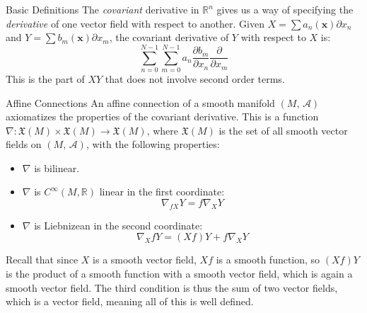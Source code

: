 \documentclass{beamer}
\begin{document}
    \begin{frame}{Basic Definitions}
        The \textit{covariant} derivative in $\mathbb{R}^{n}$ gives us a way
        of specifying the \textit{derivative} of one vector field with respect
        to another. Given $X=\sum{a}_{n}(\mathbf{x})\partial{x}_{n}$ and
        $Y=\sum{b}_{m}(\mathbf{x})\partial{x}_{m}$, the covariant derivative
        of $Y$ with respect to $X$ is:
        \begin{equation}
            \sum_{n=0}^{N-1}\sum_{m=0}^{N-1}a_{n}
                \frac{\partial{b}_{m}}{\partial{x}_{n}}
                \frac{\partial}{\partial{x}_{m}}
        \end{equation}
        This is the part of $XY$ that does not involve second order terms.
    \end{frame}
    \begin{frame}{Affine Connections}
        An affine connection of a smooth manifold $(M,\,\mathcal{A})$
        axiomatizes the properties of the covariant derivative. This is a
        function
        $\nabla:\mathfrak{X}(M)\times\mathfrak{X}(M)\rightarrow\mathfrak{X}(M)$,
        where $\mathfrak{X}(M)$ is the set of all smooth vector fields on
        $(M,\,\mathcal{A})$, with the following properties:
        \begin{itemize}
            \item $\nabla$ is bilinear.
            \item $\nabla$ is $C^{\infty}(M,\mathbb{R})$ linear in the first
                coordinate:
                \begin{equation}
                    \nabla_{fX}Y=f\nabla_{X}Y
                \end{equation}
            \item $\nabla$ is Liebnizean in the second coordinate:
                \begin{equation}
                    \nabla_{X}fY=(Xf)Y+f\nabla_{X}Y
                \end{equation}
        \end{itemize}
        Recall that since $X$ is a smooth vector field, $Xf$ is a smooth
        function, so $(Xf)Y$ is the product of a smooth function with a smooth
        vector field, which is again a smooth vector field. The third condition
        is thus the sum of two vector fields, which is a vector field, meaning
        all of this is well defined.
    \end{frame}
\end{document}
